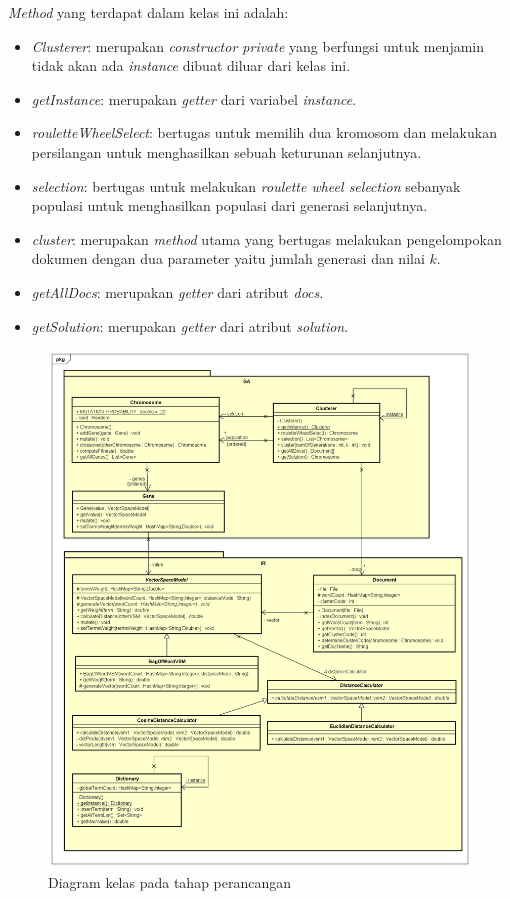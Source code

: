 \documentclass[a4paper,twoside]{article}
\begin{document}
\begin{enumerate}
\textit{Method} yang terdapat dalam kelas ini adalah:

\begin{itemize}
	\item \textit{Clusterer}: merupakan \textit{constructor private} yang berfungsi untuk menjamin tidak akan ada \textit{instance} dibuat diluar dari kelas ini.
	\item \textit{getInstance}: merupakan \textit{getter} dari variabel \textit{instance}.
	\item \textit{rouletteWheelSelect}: bertugas untuk memilih dua kromosom dan melakukan persilangan untuk menghasilkan sebuah keturunan selanjutnya.
	\item \textit{selection}: bertugas untuk melakukan \textit{roulette wheel selection} sebanyak populasi untuk menghasilkan populasi dari generasi selanjutnya.
	\item \textit{cluster}: merupakan \textit{method} utama yang bertugas melakukan pengelompokan dokumen dengan dua parameter yaitu jumlah generasi dan nilai $k$.
	\item \textit{getAllDocs}: merupakan \textit{getter} dari atribut \textit{docs}.
	\item \textit{getSolution}: merupakan \textit{getter} dari atribut \textit{solution}.
\end{itemize}

\begin{figure}
	\begin{center}
		\includegraphics[width=\textwidth]{DiagramKelas}
		\caption{Diagram kelas pada tahap perancangan}
		\label{fig:diagramkelas}
	\end{center}
\end{figure}


\end{enumerate}
\end{document}
